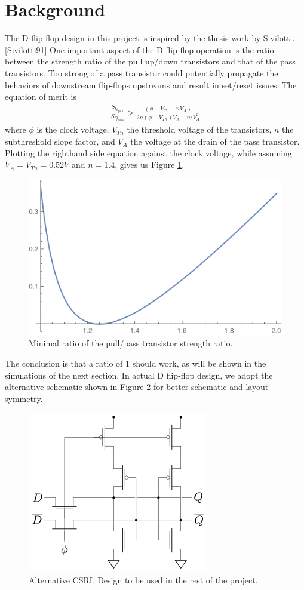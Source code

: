 \documentclass[11pt]{article}
\begin{document}
\section{Background}
    The D flip-flop design in this project is inspired by the thesis work by Sivilotti. [Sivilotti91] One important aspect of the D flip-flop operation is the ratio between the strength ratio of the pull up/down transistors and that of the pass transistors. Too strong of a pass transistor could potentially propagate the behaviors of downstream flip-flops upstreams and result in set/reset issues. The equation of merit is
    \begin{align}
        \frac{S_{Q_{pull}}}{S_{Q_{pass}}} > \frac{(\phi-V_{Tn}-nV_A)}{2n(\phi-V_{Tn})V_A-n^2V_A^2}
    \end{align}
    where $\phi$ is the clock voltage, $V_{Tn}$ the threshold voltage of the transistors, $n$ the subthreshold slope factor, and $V_A$ the voltage at the drain of the pass transistor. Plotting the righthand side equation against the clock voltage, while assuming $V_A=V_{Tn}=0.52V$ and $n=1.4$, gives us Figure \ref{fig:sratio}.
    \begin{figure}[!ht]
        \centering
        \includegraphics[width=.6\linewidth]{../img/sratio.png}
        \caption{Minimal ratio of the pull/pass transistor strength ratio.}
        \label{fig:sratio}
    \end{figure}
    The conclusion is that a ratio of 1 should work, as will be shown in the simulations of the next section. In actual D flip-flop design, we adopt the alternative schematic shown in Figure \ref{fig:alt} for better schematic and layout symmetry.
    \begin{figure}[!ht]
        \centering
        \includegraphics[width=.3\linewidth]{../img/altCSRLphilatch.png}
        \caption{Alternative CSRL Design to be used in the rest of the project.}
        \label{fig:alt}
    \end{figure}
\end{document}
